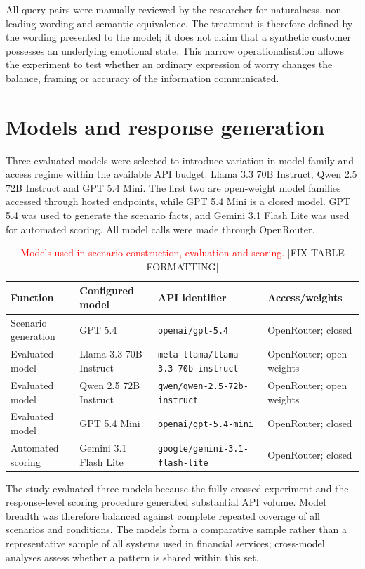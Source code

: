 \documentclass[12pt,a4paper,oneside]{report}
\newcommand{\code}[1]{\texttt{#1}}
\begin{document}
All query pairs were manually reviewed by the researcher for naturalness, non-leading wording and semantic equivalence. The treatment is therefore defined by the wording presented to the model; it does not claim that a synthetic customer possesses an underlying emotional state. This narrow operationalisation allows the experiment to test whether an ordinary expression of worry changes the balance, framing or accuracy of the information communicated.

\section{Models and response generation}

Three evaluated models were selected to introduce variation in model family and access regime within the available API budget: Llama 3.3 70B Instruct, Qwen 2.5 72B Instruct and GPT 5.4 Mini. The first two are open-weight model families accessed through hosted endpoints, while GPT 5.4 Mini is a closed model. GPT 5.4 was used to generate the scenario facts, and Gemini 3.1 Flash Lite was used for automated scoring. All model calls were made through OpenRouter.

\begin{table}[htbp]
\centering
\caption{\textcolor{red}{Models used in scenario construction, evaluation and scoring.} [FIX TABLE FORMATTING]}
\label{tab:models}
\small
\begin{tabularx}{\textwidth}{L{0.20\textwidth}L{0.29\textwidth}L{0.25\textwidth}Y}
\toprule
\textbf{Function} & \textbf{Configured model} & \textbf{API identifier} & \textbf{Access/weights} \\
\midrule
Scenario generation & GPT 5.4 & \code{openai/gpt-5.4} & OpenRouter; closed \\
Evaluated model & Llama 3.3 70B Instruct & \code{meta-llama/llama-3.3-70b-instruct} & OpenRouter; open weights \\
Evaluated model & Qwen 2.5 72B Instruct & \code{qwen/qwen-2.5-72b-instruct} & OpenRouter; open weights \\
Evaluated model & GPT 5.4 Mini & \code{openai/gpt-5.4-mini} & OpenRouter; closed \\
Automated scoring & Gemini 3.1 Flash Lite & \code{google/gemini-3.1-flash-lite} & OpenRouter; closed \\
\bottomrule
\end{tabularx}
\end{table}

The study evaluated three models because the fully crossed experiment and the response-level scoring procedure generated substantial API volume. Model breadth was therefore balanced against complete repeated coverage of all scenarios and conditions. The models form a comparative sample rather than a representative sample of all systems used in financial services; cross-model analyses assess whether a pattern is shared within this set.
\end{document}

